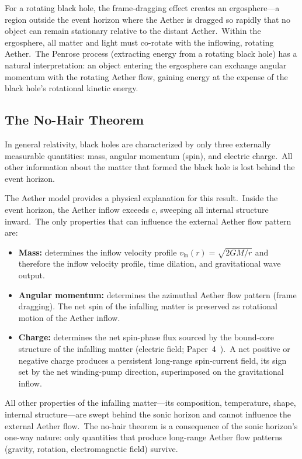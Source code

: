 ﻿\documentclass[12pt,letterpaper]{article}
\newcommand{\vin}{v_{\mathrm{in}}}
\begin{document}
For a rotating black hole, the frame-dragging effect creates an ergosphere---a region
outside the event horizon where the Aether is dragged so rapidly that no object can remain
stationary relative to the distant Aether.\ Within the ergosphere, all matter and light
must co-rotate with the inflowing, rotating Aether.\ The Penrose process \cite{penrose1969} (extracting energy
from a rotating black hole) has a natural interpretation: an object entering the ergosphere
can exchange angular momentum with the rotating Aether flow, gaining energy at the expense
of the black hole's rotational kinetic energy.


\subsection{The No-Hair Theorem}

In general relativity, black holes are characterized by only three externally measurable
quantities: mass, angular momentum (spin), and electric charge.\ All other information
about the matter that formed the black hole is lost behind the event horizon.

The Aether model provides a physical explanation for this result.\ Inside the event
horizon, the Aether inflow exceeds $c$, sweeping all internal structure inward.\ The only
properties that can influence the external Aether flow pattern are:

\begin{itemize}[leftmargin=2em]
  \item \textbf{Mass:} determines the inflow velocity profile $\vin(r) = \sqrt{2GM/r}$ and therefore the
    inflow velocity profile, time dilation, and gravitational wave output.

  \item \textbf{Angular momentum:} determines the azimuthal Aether flow pattern (frame dragging).
    The net spin of the infalling matter is preserved as rotational motion of the Aether
    inflow.

  \item \textbf{Charge:} determines the net spin-phase flux sourced
    by the bound-core structure of the infalling matter (electric field;
    Paper~4~\cite{otto-em}).\ A net positive or negative charge produces a
    persistent long-range spin-current field, its sign set by the net
    winding-pump direction, superimposed on the gravitational inflow.
\end{itemize}

All other properties of the infalling matter---its composition, temperature, shape,
internal structure---are swept behind the sonic horizon and cannot influence the external
Aether flow.\ The no-hair theorem is a consequence of the sonic horizon's one-way nature:
only quantities that produce long-range Aether flow patterns (gravity, rotation,
electromagnetic field) survive.
\end{document}

